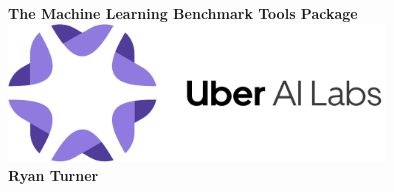 \documentclass[a0,landscape]{a0poster}
\begin{document}


\begin{centering}{\fontsize{100}{120} \selectfont \color{NavyBlue} \textbf{The Machine Learning Benchmark Tools Package} \color{Black}}\\ %
\includegraphics[width=10cm]{uber_ai_logo_bootleg.pdf} \\ %
\Huge \textbf{Ryan Turner}\\ %
\end{centering}

\vspace{1cm} %

\end{document}

